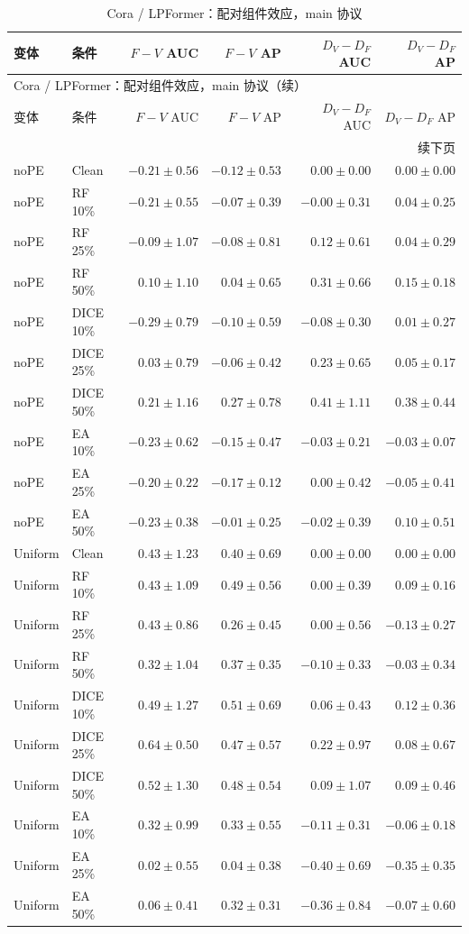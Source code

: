 {\footnotesize
\setlength{\tabcolsep}{3.2pt}
\renewcommand{\arraystretch}{1.10}
\begin{longtable}{llrrrr}
\caption{Cora / LPFormer：配对组件效应，main 协议}\\
\toprule
变体 & 条件 & $F-V$ AUC & $F-V$ AP & $D_V-D_F$ AUC & $D_V-D_F$ AP \\
\midrule
\endfirsthead
\multicolumn{6}{l}{Cora / LPFormer：配对组件效应，main 协议（续）}\\
\toprule
变体 & 条件 & $F-V$ AUC & $F-V$ AP & $D_V-D_F$ AUC & $D_V-D_F$ AP \\
\midrule
\endhead
\midrule\multicolumn{6}{r}{续下页}\\
\endfoot
\bottomrule
\endlastfoot
noPE & Clean & $-0.21\pm0.56$ & $-0.12\pm0.53$ & $0.00\pm0.00$ & $0.00\pm0.00$ \\
noPE & RF 10\% & $-0.21\pm0.55$ & $-0.07\pm0.39$ & $-0.00\pm0.31$ & $0.04\pm0.25$ \\
noPE & RF 25\% & $-0.09\pm1.07$ & $-0.08\pm0.81$ & $0.12\pm0.61$ & $0.04\pm0.29$ \\
noPE & RF 50\% & $0.10\pm1.10$ & $0.04\pm0.65$ & $0.31\pm0.66$ & $0.15\pm0.18$ \\
noPE & DICE 10\% & $-0.29\pm0.79$ & $-0.10\pm0.59$ & $-0.08\pm0.30$ & $0.01\pm0.27$ \\
noPE & DICE 25\% & $0.03\pm0.79$ & $-0.06\pm0.42$ & $0.23\pm0.65$ & $0.05\pm0.17$ \\
noPE & DICE 50\% & $0.21\pm1.16$ & $0.27\pm0.78$ & $0.41\pm1.11$ & $0.38\pm0.44$ \\
noPE & EA 10\% & $-0.23\pm0.62$ & $-0.15\pm0.47$ & $-0.03\pm0.21$ & $-0.03\pm0.07$ \\
noPE & EA 25\% & $-0.20\pm0.22$ & $-0.17\pm0.12$ & $0.00\pm0.42$ & $-0.05\pm0.41$ \\
noPE & EA 50\% & $-0.23\pm0.38$ & $-0.01\pm0.25$ & $-0.02\pm0.39$ & $0.10\pm0.51$ \\
Uniform & Clean & $0.43\pm1.23$ & $0.40\pm0.69$ & $0.00\pm0.00$ & $0.00\pm0.00$ \\
Uniform & RF 10\% & $0.43\pm1.09$ & $0.49\pm0.56$ & $0.00\pm0.39$ & $0.09\pm0.16$ \\
Uniform & RF 25\% & $0.43\pm0.86$ & $0.26\pm0.45$ & $0.00\pm0.56$ & $-0.13\pm0.27$ \\
Uniform & RF 50\% & $0.32\pm1.04$ & $0.37\pm0.35$ & $-0.10\pm0.33$ & $-0.03\pm0.34$ \\
Uniform & DICE 10\% & $0.49\pm1.27$ & $0.51\pm0.69$ & $0.06\pm0.43$ & $0.12\pm0.36$ \\
Uniform & DICE 25\% & $0.64\pm0.50$ & $0.47\pm0.57$ & $0.22\pm0.97$ & $0.08\pm0.67$ \\
Uniform & DICE 50\% & $0.52\pm1.30$ & $0.48\pm0.54$ & $0.09\pm1.07$ & $0.09\pm0.46$ \\
Uniform & EA 10\% & $0.32\pm0.99$ & $0.33\pm0.55$ & $-0.11\pm0.31$ & $-0.06\pm0.18$ \\
Uniform & EA 25\% & $0.02\pm0.55$ & $0.04\pm0.38$ & $-0.40\pm0.69$ & $-0.35\pm0.35$ \\
Uniform & EA 50\% & $0.06\pm0.41$ & $0.32\pm0.31$ & $-0.36\pm0.84$ & $-0.07\pm0.60$ \\
\end{longtable}
}

